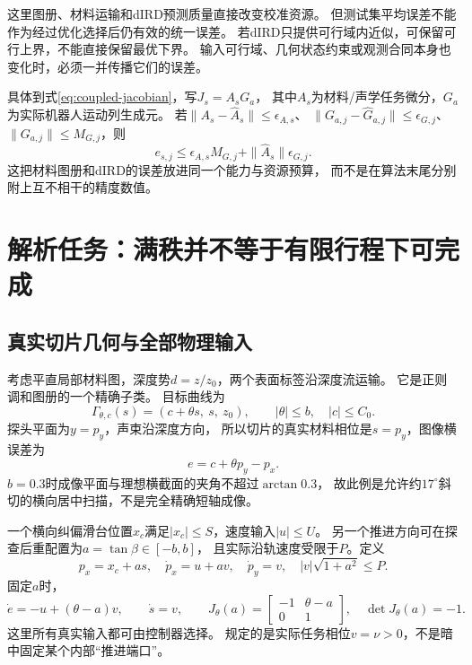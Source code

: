 \documentclass[11pt,a4paper]{article}
\numberwithin{equation}{section}
\theoremstyle{definition}
\begin{document}
这里图册、材料运输和dIRD预测质量直接改变校准资源。
但测试集平均误差不能作为经过优化选择后仍有效的统一误差。
若dIRD只提供可行域内近似，可保留可行上界，不能直接保留最优下界。
输入可行域、几何状态约束或观测合同本身也变化时，必须一并传播它们的误差。

具体到式\eqref{eq:coupled-jacobian}，写$J_s=A_sG_a$，
其中$A_s$为材料/声学任务微分，$G_a$为实际机器人运动列生成元。
若$\|A_s-\widehat A_s\|\le\epsilon_{A,s}$、
$\|G_{a,j}-\widehat G_{a,j}\|\le\epsilon_{G,j}$、
$\|G_{a,j}\|\le M_{G,j}$，则
\[
 e_{s,j}\le\epsilon_{A,s}M_{G,j}
                 +\|\widehat A_s\|\epsilon_{G,j}.
\]
这把材料图册和dIRD的误差放进同一个能力与资源预算，
而不是在算法末尾分别附上互不相干的精度数值。

\section{解析任务：满秩并不等于有限行程下可完成}
\subsection{真实切片几何与全部物理输入}
考虑平直局部材料图，深度势$d=z/z_0$，两个表面标签沿深度流运输。
它是正则调和图册的一个精确子类。
目标曲线为
\begin{equation}
 \Gamma_{\theta,c}(s)=(c+\theta s,\ s,\ z_0),\qquad
 |\theta|\le b,\quad |c|\le C_0.
 \label{eq:vessel}
\end{equation}
探头平面为$y=p_y$，声束沿深度方向，
所以切片的真实材料相位是$s=p_y$，图像横误差为
\[
 e=c+\theta p_y-p_x .
\]
$b=0.3$时成像平面与理想横截面的夹角不超过$\arctan 0.3$，
故此例是允许约$17^\circ$斜切的横向居中扫描，不是完全精确短轴成像。

一个横向纠偏滑台位置$x_c$满足$|x_c|\le S$，速度输入$|u|\le U$。
另一个推进方向可在探查后重配置为$a=\tan\beta\in[-b,b]$，
且实际沿轨速度受限于$P$。定义
\begin{equation}
 p_x=x_c+a s,\quad
 \dot p_x=u+a v,\quad
 \dot p_y=v,\quad
 |v|\sqrt{1+a^2}\le P.
 \label{eq:stage}
\end{equation}
固定$a$时，
\begin{equation}
 \dot e=-u+(\theta-a)v,\qquad
 \dot s=v,\qquad
 J_\theta(a)=
 \begin{bmatrix}-1&\theta-a\\0&1\end{bmatrix},
 \quad \det J_\theta(a)=-1.
 \label{eq:shear}
\end{equation}
这里所有真实输入都可由控制器选择。
规定的是实际任务相位$v=\nu>0$，不是暗中固定某个内部“推进端口”。
\end{document}
